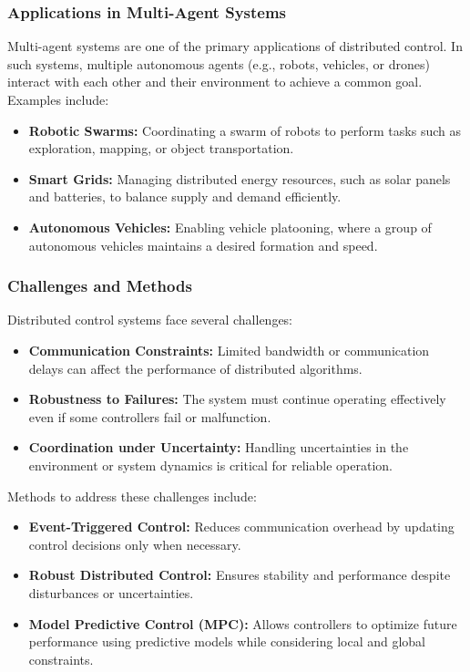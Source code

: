 \documentclass{IEEEojcsys}
\begin{document}
\subsubsection{Applications in Multi-Agent Systems}
Multi-agent systems are one of the primary applications of distributed control. In such systems, multiple autonomous agents (e.g., robots, vehicles, or drones) interact with each other and their environment to achieve a common goal. Examples include:
\begin{itemize}
    \item \textbf{Robotic Swarms:} Coordinating a swarm of robots to perform tasks such as exploration, mapping, or object transportation.
    \item \textbf{Smart Grids:} Managing distributed energy resources, such as solar panels and batteries, to balance supply and demand efficiently.
    \item \textbf{Autonomous Vehicles:} Enabling vehicle platooning, where a group of autonomous vehicles maintains a desired formation and speed.
\end{itemize}

\subsubsection{Challenges and Methods}
Distributed control systems face several challenges:
\begin{itemize}
    \item \textbf{Communication Constraints:} Limited bandwidth or communication delays can affect the performance of distributed algorithms.
    \item \textbf{Robustness to Failures:} The system must continue operating effectively even if some controllers fail or malfunction.
    \item \textbf{Coordination under Uncertainty:} Handling uncertainties in the environment or system dynamics is critical for reliable operation.
\end{itemize}

Methods to address these challenges include:
\begin{itemize}
    \item \textbf{Event-Triggered Control:} Reduces communication overhead by updating control decisions only when necessary.
    \item \textbf{Robust Distributed Control:} Ensures stability and performance despite disturbances or uncertainties.
    \item \textbf{Model Predictive Control (MPC):} Allows controllers to optimize future performance using predictive models while considering local and global constraints.
\end{itemize}
\end{document}
